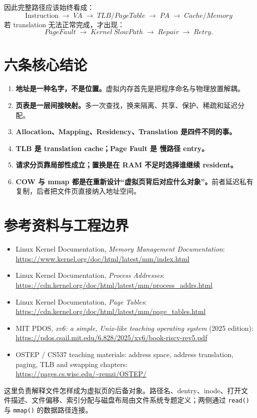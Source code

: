 \documentclass[11pt,a4paper]{ctexart}
\newcommand{\kw}[1]{\textbf{#1}}
\newcommand{\code}[1]{\texttt{#1}}
\newcommand{\arr}{\;\longrightarrow\;}
\begin{document}
因此完整路径应该始终看成：
\[
\boxed{
\text{Instruction}
\arr VA
\arr TLB/PageTable
\arr PA
\arr Cache/Memory
}
\]
若 translation 无法正常完成，才出现：
\[
\boxed{PageFault\arr Kernel\ SlowPath\arr Repair\arr Retry.}
\]

\section{六条核心结论}
\begin{corebox}[复原主干]
\begin{enumerate}
  \item \kw{地址是一种名字，不是位置。}虚拟内存首先是把程序命名与物理放置解耦。
  \item \kw{页表是一层间接映射。}多一次查找，换来隔离、共享、保护、稀疏和延迟分配。
  \item \kw{Allocation、Mapping、Residency、Translation 是四件不同的事。}
  \item \kw{TLB 是 translation cache；Page Fault 是 慢路径 entry。}
  \item \kw{请求分页靠局部性成立；置换是在 RAM 不足时选择谁继续 resident。}
  \item \kw{COW 与 mmap 都是在重新设计“虚拟页背后对应什么对象”。}前者延迟私有复制，后者把文件页直接纳入地址空间。
\end{enumerate}
\end{corebox}

\section*{参考资料与工程边界}
\small
\begin{itemize}
  \item Linux Kernel Documentation, \emph{Memory Management Documentation}: \url{https://www.kernel.org/doc/html/latest/mm/index.html}
  \item Linux Kernel Documentation, \emph{Process Addresses}: \url{https://cdn.kernel.org/doc/html/latest/mm/process_addrs.html}
  \item Linux Kernel Documentation, \emph{Page Tables}: \url{https://cdn.kernel.org/doc/html/latest/mm/page_tables.html}
  \item MIT PDOS, \emph{xv6: a simple, Unix-like teaching operating system} (2025 edition): \url{https://pdos.csail.mit.edu/6.828/2025/xv6/book-riscv-rev5.pdf}
  \item OSTEP / CS537 teaching materials: address space, address translation, paging, TLB and swapping chapters: \url{https://pages.cs.wisc.edu/~remzi/OSTEP/}
\end{itemize}

\begin{method}[与文件系统的接口]
这里负责解释文件怎样成为虚拟页的后备对象。路径名、dentry、inode、打开文件描述、文件偏移、索引分配与磁盘布局由文件系统专题定义；两侧通过 \code{read()} 与 \code{mmap()} 的数据路径连接。
\end{method}
\end{document}

